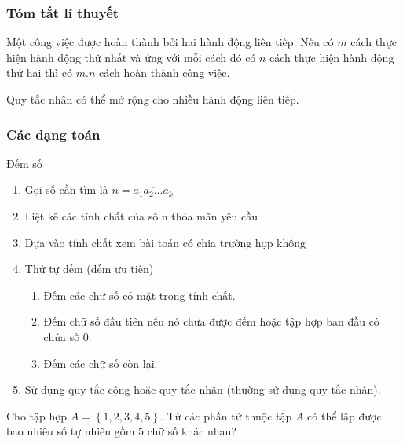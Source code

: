 \subsubsection{Tóm tắt lí thuyết}
\begin{dn}
Một công việc được hoàn thành bởi hai hành động liên tiếp. Nếu có $m$ cách thực hiện hành động thứ nhất và ứng với mỗi cách đó có $n$ cách thực hiện hành động thứ hai thì có $m.n$ cách hoàn thành công việc.
\end{dn}
\begin{note}
Quy tắc nhân có thể mở rộng cho nhiều hành động liên tiếp.
\end{note}
\subsubsection{Các dạng toán}
\begin{dang}{Đếm số}
\begin{enumerate}[Bước 1.]
\item Gọi số cần tìm là $n=\overline{a_1a_2...a_k}$
\item Liệt kê các tính chất của số n thỏa mãn yêu cầu
\item Dựa vào tính chất xem bài toán có chia trường hợp không
\item Thứ tự đếm (đếm ưu tiên)
\begin{enumerate}[Thứ 1.]
\item Đếm các chữ số có mặt trong tính chất.
\item Đếm chữ số đầu tiên nếu nó chưa được đếm hoặc tập hợp ban đầu có chứa số $0$.
\item Đếm các chữ số còn lại.
\end{enumerate}
\item Sử dụng quy tắc cộng hoặc quy tắc nhân (thường sử dụng quy tắc nhân).
\end{enumerate}
\end{dang}

\begin{vd}%
Cho tập hợp $A=\left\{1,2,3,4,5\right\}$. Từ các phần  tử thuộc tập $A$ có thể lập được bao nhiêu số tự nhiên gồm $5$ chữ số khác nhau?
\end{vd}

